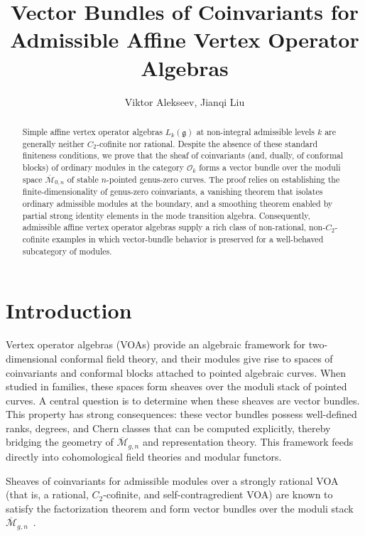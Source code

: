 \documentclass[12pt,a4paper,reqno]{amsart}
\title[Coinvariants of admissible-level affine VOAs]{Vector Bundles of Coinvariants for Admissible Affine Vertex Operator Algebras}
\author[V. Alekseev, J. Liu]{Viktor Alekseev, Jianqi Liu}
\numberwithin{equation}{section}
\theoremstyle{definition}
\newcommand{\g}{\mathfrak{g}}
\newcommand{\M}{\mathcal{M}}
\def\O{\mathcal{O}}
\begin{document}
    \begin{abstract}
        Simple affine vertex operator algebras $L_k(\g)$ at non-integral admissible levels $k$ are generally neither $C_2$-cofinite nor rational. Despite the absence of these standard finiteness conditions, we prove that the sheaf of coinvariants (and, dually, of conformal blocks) of ordinary modules in the category $\O_k$ forms a vector bundle over the moduli space $\overline{\M}_{0,n}$ of stable $n$-pointed genus-zero curves. The proof relies on establishing the finite-dimensionality of genus-zero coinvariants, a vanishing theorem that isolates ordinary admissible modules at the boundary, and a smoothing theorem enabled by partial strong identity elements in the mode transition algebra. Consequently, admissible affine vertex operator algebras supply a rich class of non-rational, non-$C_2$-cofinite examples in which vector-bundle behavior is preserved for a well-behaved subcategory of modules.
    \end{abstract}
	\maketitle
\section{Introduction}\label{sec:intro}


Vertex operator algebras (VOAs) provide an algebraic framework for two-dimensional conformal field theory, and their modules give rise to spaces of coinvariants and conformal blocks attached to pointed algebraic curves. When studied in families, these spaces form sheaves over the moduli stack of pointed curves. A central question is to determine when these sheaves are vector bundles. This property has strong consequences: these vector bundles possess well-defined ranks, degrees, and Chern classes that can be computed explicitly, thereby bridging the geometry of $\overline{\M}_{g,n}$ and representation theory. This framework feeds directly into cohomological field theories and modular functors.

Sheaves of coinvariants for admissible modules over a strongly rational VOA (that is, a rational, $C_2$-cofinite, and self-contragredient VOA) are known to satisfy the factorization theorem and form vector bundles over the moduli stack $\overline{\M}_{g,n}$~\cite{DGT2}.
\end{document}
